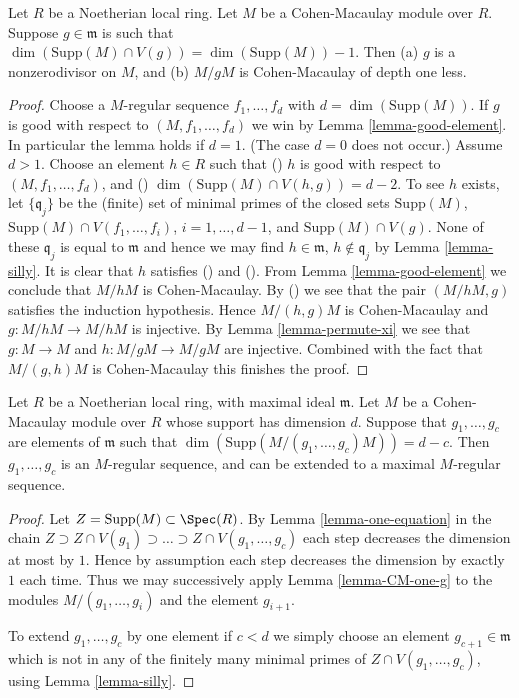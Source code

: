 \begin{lemma}
\label{lemma-CM-one-g}
Let $R$ be a Noetherian local ring.
Let $M$ be a Cohen-Macaulay module over $R$.
Suppose $g \in \mathfrak m$ is such that $\dim(\text{Supp}(M) \cap V(g))
= \dim(\text{Supp}(M)) - 1$. Then (a) $g$ is a nonzerodivisor on $M$,
and (b) $M/gM$ is Cohen-Macaulay of depth one less.
\end{lemma}

\begin{proof}
Choose a $M$-regular sequence $f_1, \ldots, f_d$ with
$d = \dim(\text{Supp}(M))$. If $g$ is good with respect to
$(M, f_1, \ldots, f_d)$ we win by Lemma \ref{lemma-good-element}.
In particular the lemma holds if $d = 1$. (The case $d = 0$ does
not occur.) Assume $d > 1$. Choose an element $h \in R$ such that
() $h$ is good with respect to $(M, f_1, \ldots, f_d)$,
and () $\dim(\text{Supp}(M) \cap V(h, g)) = d - 2$.
To see $h$ exists, let $\{\mathfrak q_j\}$ be the (finite) set of
minimal primes of the closed sets $\text{Supp}(M)$,
$\text{Supp}(M)\cap V(f_1, \ldots, f_i)$, $i = 1, \ldots, d - 1$,
and $\text{Supp}(M) \cap V(g)$. None of these $\mathfrak q_j$
is equal to $\mathfrak m$ and hence we may find $h \in \mathfrak m$,
$h \not \in \mathfrak q_j$ by Lemma \ref{lemma-silly}. It is clear
that $h$ satisfies () and (). From
Lemma \ref{lemma-good-element} we conclude that
$M/hM$ is Cohen-Macaulay. By () we see that the pair
$(M/hM, g)$ satisfies the induction hypothesis. Hence
$M/(h, g)M$ is Cohen-Macaulay and $g : M/hM \to M/hM$
is injective. By Lemma \ref{lemma-permute-xi} we see
that $g : M \to M$ and $h : M/gM \to M/gM$
are injective. Combined with the fact that $M/(g, h)M$
is Cohen-Macaulay this finishes the proof.
\end{proof}

\begin{proposition}
\label{proposition-CM-module}
Let $R$ be a Noetherian local ring, with maximal ideal $\mathfrak m$.
Let $M$ be a Cohen-Macaulay module over $R$ whose support has dimension $d$.
Suppose that $g_1, \ldots, g_c$ are elements of
$\mathfrak m$ such that $\dim(\text{Supp}(M/(g_1, \ldots, g_c)M))
= d - c$. Then $g_1, \ldots, g_c$ is an $M$-regular sequence,
and can be extended to a maximal $M$-regular sequence.
\end{proposition}

\begin{proof}
Let $Z = \text{Supp}(M) \subset \Spec(R)$.
By Lemma \ref{lemma-one-equation} in the chain
$Z \supset Z \cap V(g_1) \supset \ldots \supset Z \cap V(g_1, \ldots, g_c)$
each step decreases the dimension at most by $1$. Hence by assumption
each step decreases the dimension by exactly $1$ each time. Thus we
may successively apply Lemma \ref{lemma-CM-one-g} to the modules
$M/(g_1, \ldots, g_i)$ and the element $g_{i + 1}$.

\medskip\noindent
To extend $g_1, \ldots, g_c$ by one element if $c < d$ we simply
choose an element $g_{c + 1} \in \mathfrak m$ which is not
in any of the finitely many minimal primes of $Z \cap V(g_1, \ldots, g_c)$,
using Lemma \ref{lemma-silly}.
\end{proof}

